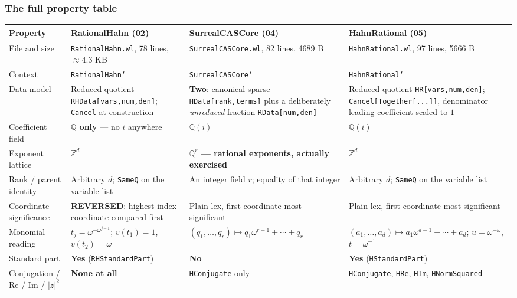 \documentclass[11pt,letterpaper]{article}
\numberwithin{equation}{section}
\theoremstyle{definition}
\theoremstyle{remark}
\newcommand{\Q}{\mathbb Q}
\newcommand{\Z}{\mathbb Z}
\begin{document}
\subsubsection{The full property table}
\label{cas:subsub-table}
\begingroup\footnotesize
\begin{longtable}{@{}P{0.155\textwidth}P{0.245\textwidth}P{0.245\textwidth}P{0.245\textwidth}@{}}
\toprule
Property & \textbf{RationalHahn} (02) & \textbf{SurrealCASCore} (04) &
\textbf{HahnRational} (05)\\
\midrule\endhead
File and size & \texttt{RationalHahn.wl}, 78 lines, $\approx$4.3 KB &
\texttt{SurrealCASCore.wl}, 82 lines, 4689 B &
\texttt{HahnRational.wl}, 97 lines, 5666 B\\[0.4em]
Context & \texttt{RationalHahn`} & \texttt{SurrealCASCore`} &
\texttt{HahnRational`}\\[0.4em]
Data model & Reduced quotient \texttt{RHData[vars,num,den]}; \texttt{Cancel} at
construction & \textbf{Two}: canonical sparse \texttt{HData[rank,terms]} plus a
deliberately \emph{unreduced} fraction \texttt{RData[num,den]} &
Reduced quotient \texttt{HR[vars,num,den]};
\texttt{Cancel[Together[...]]}, denominator leading coefficient scaled to
$1$\\[0.4em]
Coefficient field & \textbf{$\Q$ only} --- no $i$ anywhere & $\Q(i)$ & $\Q(i)$\\[0.4em]
Exponent lattice & $\Z^d$ & \textbf{$\Q^r$ --- rational exponents, actually
exercised} & $\Z^d$\\[0.4em]
Rank / parent identity & Arbitrary $d$; \texttt{SameQ} on the variable list &
An integer field $r$; equality of that integer & Arbitrary $d$; \texttt{SameQ}
on the variable list\\[0.4em]
Coordinate significance & \textbf{REVERSED}: highest-index coordinate compared
first & Plain lex, first coordinate most significant &
Plain lex, first coordinate most significant\\[0.4em]
Monomial reading & $t_j=\omega^{-\omega^{j-1}}$; $v(t_1)=1$, $v(t_2)=\omega$ &
$(q_1,\dots,q_r)\mapsto q_1\omega^{r-1}+\cdots+q_r$ &
$(a_1,\dots,a_d)\mapsto a_1\omega^{d-1}+\cdots+a_d$; $u=\omega^{-\omega}$,
$t=\omega^{-1}$\\[0.4em]
Standard part & \textbf{Yes} (\texttt{RHStandardPart}) & \textbf{No} &
\textbf{Yes} (\texttt{HStandardPart})\\[0.4em]
Conjugation / Re / Im / $|z|^2$ & \textbf{None at all} &
\texttt{HConjugate} only & \texttt{HConjugate}, \texttt{HRe}, \texttt{HIm},
\texttt{HNormSquared}\\[0.4em]

\end{longtable}
\end{document}
